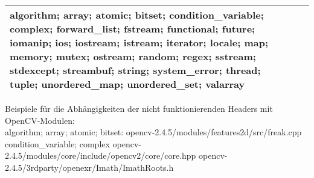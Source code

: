 \documentclass[10pt,a4paper]{article}
\begin{document}
\begin{center}
\begin{tabular}{ | p{3cm} | p{3cm} | p{3cm} |}
algorithm; \newline
array; \newline
atomic; \newline
bitset; \newline
condition\_variable; \newline
complex; \newline
forward\_list; \newline
fstream; \newline
functional; \newline
future; \newline
iomanip; \newline
ios; \newline
iostream; \newline
istream; \newline
iterator; \newline
locale; \newline
map; \newline
memory; \newline
mutex; \newline
ostream; \newline
random; \newline
regex; \newline
sstream; \newline
stdexcept; \newline
streambuf; \newline
string; \newline
system\_error; \newline
thread; \newline
tuple; \newline
unordered\_map; \newline
unordered\_set; \newline
valarray \\
    \hline
  \end{tabular}
\end{center}

Beispiele für die Abhängigkeiten der nicht funktionierenden Headers mit OpenCV-Modulen: \\

algorithm; array; atomic; bitset: \newline
opencv-2.4.5/modules/features2d/src/freak.cpp \\

condition\_variable; complex \newline
opencv-2.4.5/modules/core/include/opencv2/core/core.hpp \newline
opencv-2.4.5/3rdparty/openexr/Imath/ImathRoots.h \\
\end{document}
